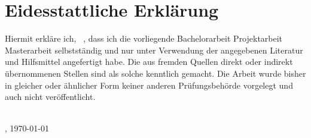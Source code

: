 \documentclass[
              11pt,								  %
              twoside,                              %
              numbers=noenddot,                     %
              listof=totoc,                         %
              bibliography=totoc,                   %
              captions=tableheading, %
              openright,							%
              ]{scrreprt}                           %
\begin{document}
\section*{Eidesstattliche Erklärung}	%
\vspace{1cm}
\thispagestyle{empty}

Hiermit erkläre ich, \VornameDesStudenten \ \NachnameDesStudenten, dass ich die vorliegende 
			{Bachelorarbeit}{}
			{Projektarbeit}{}
			{Masterarbeit}{} selbstständig und nur unter Verwendung der angegebenen Literatur und Hilfsmittel angefertigt habe. Die aus fremden Quellen direkt oder indirekt übernommenen Stellen sind als solche kenntlich gemacht. 
Die Arbeit wurde bisher in gleicher oder ähnlicher Form keiner anderen Prüfungsbehörde vorgelegt und auch nicht veröffentlicht. 
\\
\\
\par

\Ort, \today  \hfill \hrulefill

\hfill \VornameDesStudenten \ \NachnameDesStudenten \hfill
\end{document}
